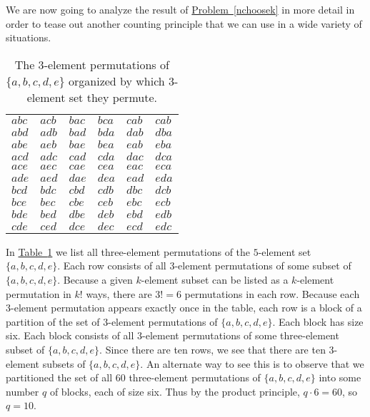 \documentclass[10pt,]{book}
\theoremstyle{plain}
\theoremstyle{definition}
\theoremstyle{definition}
\numberwithin{equation}{chapter}
\begin{document}
We are now going to analyze the result of \hyperref[nchoosek]{Problem~\ref{nchoosek}} in more detail in order to tease out another counting principle that we can use in a wide variety of situations.%
\begin{table}
\centering
\begin{tabular}{llllll}
\(abc\)&\(acb\)&\(bac\)&\(bca\)&\(cab\)&\(cab\)\tabularnewline[0pt]
\(abd\)&\(adb\)&\(bad\)&\(bda\)&\(dab\)&\(dba\)\tabularnewline[0pt]
\(abe\)&\(aeb\)&\(bae\)&\(bea\)&\(eab\)&\(eba\)\tabularnewline[0pt]
\(acd\)&\(adc\)&\(cad\)&\(cda\)&\(dac\)&\(dca\)\tabularnewline[0pt]
\(ace\)&\(aec\)&\(cae\)&\(cea\)&\(eac\)&\(eca\)\tabularnewline[0pt]
\(ade\)&\(aed\)&\(dae\)&\(dea\)&\(ead\)&\(eda\)\tabularnewline[0pt]
\(bcd\)&\(bdc\)&\(cbd\)&\(cdb\)&\(dbc\)&\(dcb\)\tabularnewline[0pt]
\(bce\)&\(bec\)&\(cbe\)&\(ceb\)&\(ebc\)&\(ecb\)\tabularnewline[0pt]
\(bde\)&\(bed\)&\(dbe\)&\(deb\)&\(ebd\)&\(edb\)\tabularnewline[0pt]
\(cde\)&\(ced\)&\(dce\)&\(dec\)&\(ecd\)&\(edc\)
\end{tabular}
\caption{The \(3\)-element permutations of \(\{a,b,c,d,e\}\) organized by which \(3\)-element set they permute.\label{tab_permsof3}}
\end{table}
In \hyperref[tab_permsof3]{Table~\ref{tab_permsof3}} we list all three-element permutations of the \(5\)-element set \(\{a,b,c,d,e\}\). Each row consists of all \(3\)-element permutations of some subset of \(\{a,b,c,d,e\}\). Because a given \(k\)-element subset can be listed as a \(k\)-element permutation in \(k!\) ways, there are \(3!=6\) permutations in each row. Because each \(3\)-element permutation appears exactly once in the table, each row is a block of a partition of the set of \(3\)-element permutations of \(\{a,b,c,d,e\}\). Each block has size six. Each block consists of all \(3\)-element permutations of some three-element subset of \(\{a,b,c,d,e\}\). Since there are ten rows, we see that there are ten \(3\)-element subsets of \(\{a,b,c,d,e\}\). An alternate way to see this is to observe that we partitioned the set of all \(60\) three-element permutations of \(\{a,b,c,d,e\}\) into some number \(q\) of blocks, each of size six. Thus by the product principle, \(q\cdot 6=60\), so \(q=10\).%
\end{document}
